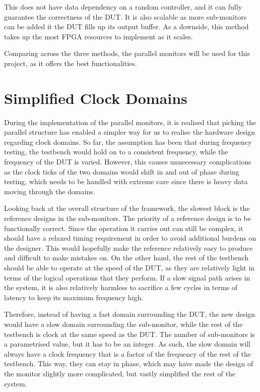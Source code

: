This does not have data dependency on a random controller, and it can fully guarantee the correctness of the DUT.
It is also scalable as more sub-monitors can be added it the DUT fills up its output buffer.
As a downside, this method takes up the most FPGA resources to implement as it scales.

Comparing across the three methods, the parallel monitors will be used for this project, as it offers the best functionalities.

\section{Simplified Clock Domains}
During the implementation of the parallel monitors, it is realised that picking the parallel structure has enabled a simpler way for us to realise the hardware design regarding clock domains.
So far, the assumption has been that during frequency testing, the testbench would hold on to a consistent frequency, while the frequency of the DUT is varied.
However, this causes unnecessary complications as the clock ticks of the two domains would shift in and out of phase during testing, which needs to be handled with extreme care since there is heavy data moving through the domains.

Looking back at the overall structure of the framework, the slowest block is the reference designs in the sub-monitors.
The priority of a reference design is to be functionally correct.
Since the operation it carries out can still be complex, it should have a relaxed timing requirement in order to avoid additional burdens on the designer.
This would hopefully make the reference relatively easy to produce and difficult to make mistakes on.
On the other hand, the rest of the testbench should be able to operate at the speed of the DUT, as they are relatively light in terms of the logical operations that they perform.
If a slow signal path arises in the system, it is also relatively harmless to sacrifice a few cycles in terms of latency to keep its maximum frequency high.

Therefore, instead of having a fast domain surrounding the DUT, the new design would have a slow domain surrounding the sub-monitor, while the rest of the testbench is clock at the same speed as the DUT.
The number of sub-monitors is a parametrised value, but it has to be an integer.
As such, the slow domain will always have a clock frequency that is a factor of the frequency of the rest of the testbench.
This way, they can stay in phase, which may have made the design of the monitor slightly more complicated, but vastly simplified the rest of the system.

